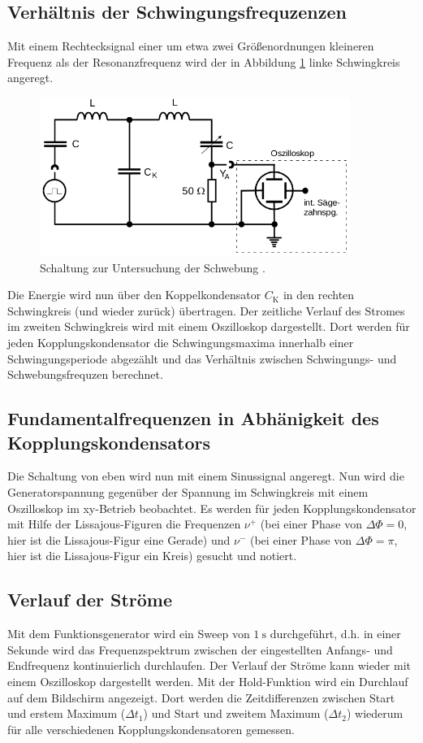 \subsection{Verhältnis der Schwingungsfrequzenzen}
Mit einem Rechtecksignal einer um etwa zwei Größenordnungen kleineren Frequenz
als der Resonanzfrequenz wird der in Abbildung \ref{fig:messung1} linke Schwingkreis
angeregt.
\begin{figure}
  \centering
  \includegraphics[width=0.9\textwidth]{messung1.png}
  \caption{Schaltung zur Untersuchung der Schwebung \cite{sample}.}
  \label{fig:messung1}
\end{figure}
Die Energie wird nun über den Koppelkondensator $C_\text{K}$ in den
rechten Schwingkreis (und wieder zurück) übertragen. Der zeitliche Verlauf des
Stromes im zweiten Schwingkreis wird mit einem Oszilloskop dargestellt. Dort
werden für jeden Kopplungskondensator die Schwingungsmaxima innerhalb einer
Schwingungsperiode abgezählt und das Verhältnis zwischen Schwingungs- und
Schwebungsfrequzen berechnet.

\subsection{Fundamentalfrequenzen in Abhänigkeit des Kopplungskondensators}
Die Schaltung von eben wird nun mit einem Sinussignal angeregt. Nun wird die
Generatorspannung gegenüber der Spannung im Schwingkreis mit einem Oszilloskop
im xy-Betrieb beobachtet. Es werden für jeden Kopplungskondensator mit Hilfe
der Lissajous-Figuren die Frequenzen $\nu^{+}$ (bei einer Phase von $\Delta \Phi = 0$,
hier ist die Lissajous-Figur eine Gerade) und $\nu^{-}$ (bei einer Phase von
$\Delta \Phi = \pi$, hier ist die Lissajous-Figur ein Kreis) gesucht und notiert.

\subsection{Verlauf der Ströme}
Mit dem Funktionsgenerator wird ein Sweep von $\SI{1}{\second}$ durchgeführt,
d.h. in einer Sekunde wird das Frequenzspektrum zwischen der eingestellten
Anfangs- und Endfrequenz kontinuierlich durchlaufen. Der Verlauf der Ströme kann
wieder mit einem Oszilloskop dargestellt werden. Mit der Hold-Funktion wird ein
Durchlauf auf dem Bildschirm angezeigt. Dort werden die Zeitdifferenzen zwischen
Start und erstem Maximum ($\Delta t_1$) und Start und zweitem Maximum ($\Delta t_2$)
wiederum für alle verschiedenen Kopplungskondensatoren gemessen.
